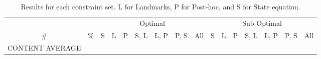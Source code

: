 \documentclass[letterpaper]{article}
\begin{document}
\begin{table*}[]
\centering
\fontsize{5}{6}\selectfont
\setlength\tabcolsep{1.5pt}
\begin{tabular}{cc|ccc|ccc|c||ccc|ccc|c}
\toprule
\multicolumn{2}{c}{} & \multicolumn{7}{c}{Optimal} & \multicolumn{7}{c}{Sub-Optimal}\\
\cmidrule(lr){3-9}\cmidrule(lr){10-16}
\# & \% & S & L & P & S, L & L, P & P, S & All%
& S & L & P & S, L & L, P & P, S & All\\
\midrule
CONTENT
\multicolumn{2}{c}{AVG} AVERAGE\\
\bottomrule
\end{tabular}\\
\caption{Results for each constraint set. L for Landmarks, P for Post-hoc, and S for State equation.}
\end{table*}
\end{document}
